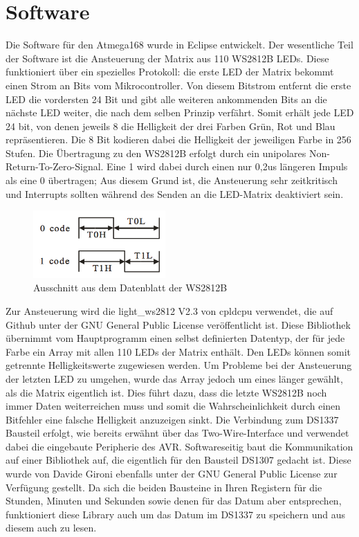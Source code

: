 \documentclass[12pt,journal,compsoc]{IEEEtran}
\begin{document}
\section{Software}
Die Software für den Atmega168 wurde in Eclipse entwickelt. Der wesentliche Teil der Software ist die Ansteuerung der Matrix aus 110 WS2812B LEDs. Diese funktioniert über ein spezielles Protokoll: die erste LED der Matrix bekommt einen Strom an Bits vom Mikrocontroller. Von diesem Bitstrom entfernt die erste LED die vordersten 24 Bit und gibt alle weiteren ankommenden Bits an die nächste LED weiter, die nach dem selben Prinzip verfährt. Somit erhält jede LED 24 bit, von denen jeweils 8 die Helligkeit der drei Farben Grün, Rot und Blau repräsentieren. Die 8 Bit kodieren dabei die Helligkeit der jeweiligen Farbe in 256 Stufen. Die Übertragung zu den WS2812B erfolgt durch ein unipolares Non-Return-To-Zero-Signal. Eine 1 wird dabei durch einen nur 0,2us längeren Impuls als eine 0 übertragen; Aus diesem Grund ist, die Ansteuerung sehr zeitkritisch und Interrupts sollten während des Senden an die LED-Matrix deaktiviert sein.
\begin{figure}[h]
	\centering
	\includegraphics[width=0.45\textwidth]{Bilder/WS2812Code}
	\caption{Ausschnitt aus dem Datenblatt der WS2812B} 
	\label{fig:WS2812Code}
\end{figure}
Zur Ansteuerung wird die light\_ws2812 V2.3 von cpldcpu verwendet, die auf Github unter der GNU General Public License veröffentlicht ist. Diese Bibliothek übernimmt vom Hauptprogramm einen selbst definierten Datentyp, der für jede Farbe ein Array mit allen 110 LEDs der Matrix enthält. Den LEDs können  somit getrennte Helligkeitswerte zugewiesen werden. Um Probleme bei der Ansteuerung der letzten LED zu umgehen, wurde das Array jedoch um eines länger gewählt, als die Matrix eigentlich ist. Dies führt dazu, dass die letzte WS2812B noch immer Daten weiterreichen muss und somit die Wahrscheinlichkeit  durch einen Bitfehler eine falsche Helligkeit anzuzeigen sinkt.
Die  Verbindung zum DS1337 Bausteil erfolgt, wie bereits erwähnt über das Two-Wire-Interface und verwendet dabei die eingebaute Peripherie des AVR. Softwareseitig baut die Kommunikation auf einer Bibliothek auf, die eigentlich für den Bausteil DS1307 gedacht ist. Diese wurde von Davide Gironi  ebenfalls unter der GNU General Public License zur Verfügung gestellt. Da sich die beiden Bausteine in Ihren Registern für die Stunden, Minuten und Sekunden sowie denen für das Datum aber entsprechen, funktioniert diese Library auch um das Datum im DS1337 zu speichern und aus diesem auch zu lesen. 
\end{document}
